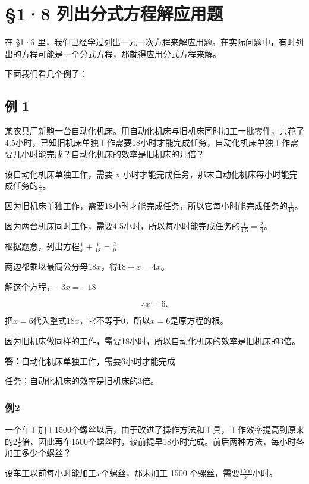\section{§1·8 列出分式方程解应用题}

在 §1·6
里，我们已经学过列出一元一次方程来解应用题。在实际问题中，有时列出的方程可能是一个分式方程，那就得应用分式方程来解。

下面我们看几个例子：

\subsection{例 1}

某农具厂新购一台自动化机床。用自动化机床与旧机床同时加工一批零件，共花了4.5小时，已知旧机床单独工作需要18小时才能完成任务，自动化机床单独工作需要几小时能完成？自动化机床的效率是旧机床的几倍？

 设自动化机床单独工作，需要 x
小时才能完成任务，那末自动化机床每小时能完成任务的\(\frac{1}{x}\)。

因为旧机床单独工作，需要18小时才能完成任务，所以它每小时能完成任务的\(\frac{1}{18}\)。

因为两台机床同时工作，需要4.5小时，所以每小时能完成任务的\(\frac{1}{4.5} = \frac{2}{9}\)。

根据题意，列出方程\(\frac{1}{x} + \frac{1}{18} = \frac{2}{9}\)

两边都乘以最简公分母\(18x\)，得\(18 + x = 4x\)。

解这个方程，\(-3x = -18\)

\[
\therefore x = 6.
\]

把\(x = 6\)代入整式\(18x\)，它不等于0，所以\(x = 6\)是原方程的根。

因为旧机床做同样的工作，需要18小时，所以自动化机床的效率是旧机床的3倍。

\textbf{答：}自动化机床单独工作，需要6小时才能完成

任务；自动化机床的效率是旧机床的3倍。

\subsubsection{例2}

一个车工加工1500个螺丝以后，由于改进了操作方法和工具，工作效率提高到原来的\(2\frac{1}{2}\)倍，因此再车1500个螺丝时，较前提早18小时完成。前后两种方法，每小时各加工多少个螺丝？

 设车工以前每小时能加工\(x\)个螺丝，那末加工 1500
个螺丝，需要\(\frac{1500}{x}\)小时。

